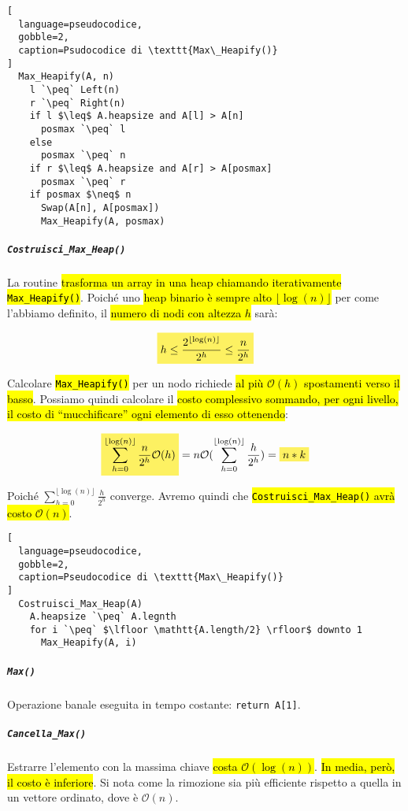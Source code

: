 \documentclass[a4paper,11pt,oneside]{article}
\theoremstyle{plain}
\theoremstyle{definition}
\theoremstyle{remark}
\newcommand{\mhl}[1]{\colorbox{hlcolor}{$\displaystyle #1$}}
\newcommand{\peq}{$\gets$}
\begin{document}
\begin{lstlisting}[
  language=pseudocodice,
  gobble=2,
  caption=Psudocodice di \texttt{Max\_Heapify()}
]
  Max_Heapify(A, n)
    l `\peq` Left(n)
    r `\peq` Right(n)
    if l $\leq$ A.heapsize and A[l] > A[n]
      posmax `\peq` l
    else
      posmax `\peq` n
    if r $\leq$ A.heapsize and A[r] > A[posmax]
      posmax `\peq` r
    if posmax $\neq$ n
      Swap(A[n], A[posmax])
      Max_Heapify(A, posmax)
\end{lstlisting}

\subparagraph{\texttt{Costruisci\_Max\_Heap()}} La routine \hl{trasforma un
array in una heap chiamando iterativamente \texttt{Max\_Heapify()}}. Poiché uno
\hl{heap binario è sempre alto $\lfloor \log(n) \rfloor$} per come l'abbiamo
definito, il \hl{numero di nodi con altezza $h$} sarà:

\begin{equation}
  \mhl{
    h \leq \frac{2^{\lfloor \log(n) \rfloor}}{2^h} \leq \frac{n}{2^h}
  }
\end{equation}

\noindent Calcolare \hl{\texttt{Max\_Heapify()}} per un nodo richiede \hl{al più
$\mathcal{O}(h)$ spostamenti verso il basso}. Possiamo quindi calcolare il
\hl{costo complessivo sommando, per ogni livello, il costo di ``mucchificare''
ogni elemento di esso ottenendo}:

\begin{equation}
  \mhl{ \sum_{h = 0}^{\lfloor \log(n) \rfloor} \frac{n}{2^h}\mathcal{O}(h) } =
    n\mathcal{O}(\sum_{h = 0}^{\lfloor \log(n) \rfloor} \frac{h}{2^h}) =
    \mhl{ n * k }
\end{equation}

\noindent Poiché $\sum_{h = 0}^{\lfloor \log(n) \rfloor} \frac{h}{2^h}$
converge. Avremo quindi che \hl{\texttt{Costruisci\_Max\_Heap()} avrà costo
$\mathcal{O}(n)$}.

\begin{lstlisting}[
  language=pseudocodice,
  gobble=2,
  caption=Pseudocodice di \texttt{Max\_Heapify()}
]
  Costruisci_Max_Heap(A)
    A.heapsize `\peq` A.legnth
    for i `\peq` $\lfloor \mathtt{A.length/2} \rfloor$ downto 1
      Max_Heapify(A, i)
\end{lstlisting}

\subparagraph{\texttt{Max()}} Operazione banale eseguita in tempo costante:
\texttt{return A[1]}.

\subparagraph{\texttt{Cancella\_Max()}} Estrarre l'elemento con la massima
chiave \hl{costa $\mathcal{O}(\log(n))$}. \hl{In media, però, il costo è
inferiore}. Si nota come la rimozione sia più efficiente rispetto a quella in un
vettore ordinato, dove è $\mathcal{O}(n)$.
\end{document}

